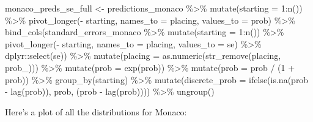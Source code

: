 \documentclass[
]{book}
\newenvironment{Shaded}{\begin{snugshade}}{\end{snugshade}}
\newcommand{\AttributeTok}[1]{\textcolor[rgb]{0.77,0.63,0.00}{#1}}
\newcommand{\DecValTok}[1]{\textcolor[rgb]{0.00,0.00,0.81}{#1}}
\newcommand{\FunctionTok}[1]{\textcolor[rgb]{0.00,0.00,0.00}{#1}}
\newcommand{\NormalTok}[1]{#1}
\newcommand{\OtherTok}[1]{\textcolor[rgb]{0.56,0.35,0.01}{#1}}
\newcommand{\SpecialCharTok}[1]{\textcolor[rgb]{0.00,0.00,0.00}{#1}}
\newcommand{\StringTok}[1]{\textcolor[rgb]{0.31,0.60,0.02}{#1}}
\begin{document}
\begin{Shaded}
\begin{Highlighting}[]
\NormalTok{monaco\_preds\_se\_full }\OtherTok{\textless{}{-}}\NormalTok{ predictions\_monaco }\SpecialCharTok{\%\textgreater{}\%}
  \FunctionTok{mutate}\NormalTok{(}\AttributeTok{starting =} \DecValTok{1}\SpecialCharTok{:}\FunctionTok{n}\NormalTok{()) }\SpecialCharTok{\%\textgreater{}\%}
  \FunctionTok{pivot\_longer}\NormalTok{(}\SpecialCharTok{{-}}\NormalTok{ starting, }\AttributeTok{names\_to =} \StringTok{\textquotesingle{}placing\textquotesingle{}}\NormalTok{, }\AttributeTok{values\_to =} \StringTok{\textquotesingle{}prob\textquotesingle{}}\NormalTok{) }\SpecialCharTok{\%\textgreater{}\%} 
  \FunctionTok{bind\_cols}\NormalTok{(standard\_errors\_monaco }\SpecialCharTok{\%\textgreater{}\%} \FunctionTok{mutate}\NormalTok{(}\AttributeTok{starting =} \DecValTok{1}\SpecialCharTok{:}\FunctionTok{n}\NormalTok{()) }\SpecialCharTok{\%\textgreater{}\%}
  \FunctionTok{pivot\_longer}\NormalTok{(}\SpecialCharTok{{-}}\NormalTok{ starting, }\AttributeTok{names\_to =} \StringTok{\textquotesingle{}placing\textquotesingle{}}\NormalTok{, }\AttributeTok{values\_to =} \StringTok{\textquotesingle{}se\textquotesingle{}}\NormalTok{) }\SpecialCharTok{\%\textgreater{}\%}
\NormalTok{    dplyr}\SpecialCharTok{::}\FunctionTok{select}\NormalTok{(se)) }\SpecialCharTok{\%\textgreater{}\%}
  \FunctionTok{mutate}\NormalTok{(}\AttributeTok{placing =} \FunctionTok{as.numeric}\NormalTok{(}\FunctionTok{str\_remove}\NormalTok{(placing, }\StringTok{\textquotesingle{}prob\_\textquotesingle{}}\NormalTok{))) }\SpecialCharTok{\%\textgreater{}\%}
  \FunctionTok{mutate}\NormalTok{(}\AttributeTok{prob =} \FunctionTok{exp}\NormalTok{(prob)) }\SpecialCharTok{\%\textgreater{}\%}
  \FunctionTok{mutate}\NormalTok{(}\AttributeTok{prob =}\NormalTok{ prob }\SpecialCharTok{/}\NormalTok{ (}\DecValTok{1} \SpecialCharTok{+}\NormalTok{ prob)) }\SpecialCharTok{\%\textgreater{}\%}
  \FunctionTok{group\_by}\NormalTok{(starting) }\SpecialCharTok{\%\textgreater{}\%} 
  \FunctionTok{mutate}\NormalTok{(}\AttributeTok{discrete\_prob =} \FunctionTok{ifelse}\NormalTok{(}\FunctionTok{is.na}\NormalTok{(prob }\SpecialCharTok{{-}} \FunctionTok{lag}\NormalTok{(prob)), prob, (prob }\SpecialCharTok{{-}} \FunctionTok{lag}\NormalTok{(prob)))) }\SpecialCharTok{\%\textgreater{}\%}
  \FunctionTok{ungroup}\NormalTok{()}
\end{Highlighting}
\end{Shaded}

Here's a plot of all the distributions for Monaco:
\end{document}
